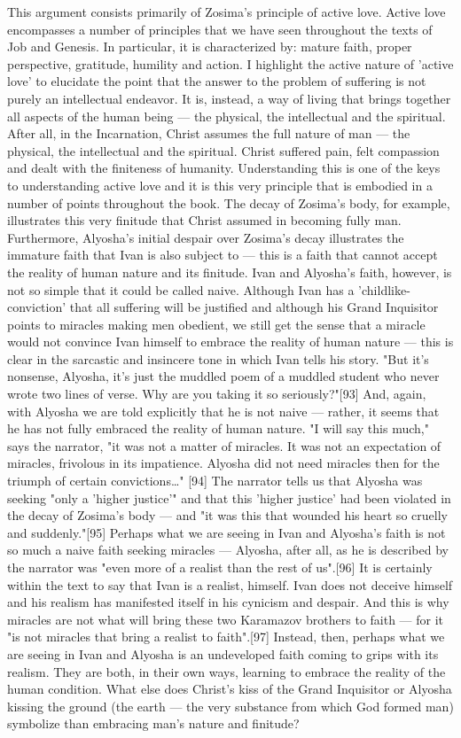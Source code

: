 This argument consists primarily of Zosima's principle of active love. Active love encompasses a number of principles that we have seen throughout the texts of Job and Genesis. In particular, it is characterized by: mature faith, proper perspective, gratitude, humility and action. I highlight the active nature of 'active love' to elucidate the point that the answer to the problem of suffering is not purely an intellectual endeavor. It is, instead, a way of living that brings together all aspects of the human being — the physical, the intellectual and the spiritual. After all, in the Incarnation, Christ assumes the full nature of man — the physical, the intellectual and the spiritual. Christ suffered pain, felt compassion and dealt with the finiteness of humanity. Understanding this is one of the keys to understanding active love and it is this very principle that is embodied in a number of points throughout the book. The decay of Zosima's body, for example, illustrates this very finitude that Christ assumed in becoming fully man. Furthermore, Alyosha's initial despair over Zosima's decay illustrates the immature faith that Ivan is also subject to — this is a faith that cannot accept the reality of human nature and its finitude.
Ivan and Alyosha's faith, however, is not so simple that it could be called naive. Although Ivan has a 'childlike-conviction' that all suffering will be justified and although his Grand Inquisitor points to miracles making men obedient, we still get the sense that a miracle would not convince Ivan himself to embrace the reality of human nature — this is clear in the sarcastic and insincere tone in which Ivan tells his story. "But it's nonsense, Alyosha, it's just the muddled poem of a muddled student who never wrote two lines of verse. Why are you taking it so seriously?"[93] And, again, with Alyosha we are told explicitly that he is not naive — rather, it seems that he has not fully embraced the reality of human nature. "I will say this much," says the narrator, "it was not a matter of miracles. It was not an expectation of miracles, frivolous in its impatience. Alyosha did not need miracles then for the triumph of certain convictions…" [94] The narrator tells us that Alyosha was seeking "only a 'higher justice'" and that this 'higher justice' had been violated in the decay of Zosima's body — and "it was this that wounded his heart so cruelly and suddenly."[95] Perhaps what we are seeing in Ivan and Alyosha's faith is not so much a naive faith seeking miracles — Alyosha, after all, as he is described by the narrator was "even more of a realist than the rest of us".[96] It is certainly within the text to say that Ivan is a realist, himself. Ivan does not deceive himself and his realism has manifested itself in his cynicism and despair. And this is why miracles are not what will bring these two Karamazov brothers to faith — for it "is not miracles that bring a realist to faith".[97] Instead, then, perhaps what we are seeing in Ivan and Alyosha is an undeveloped faith coming to grips with its realism. They are both, in their own ways, learning to embrace the reality of the human condition. What else does Christ's kiss of the Grand Inquisitor or Alyosha kissing the ground (the earth — the very substance from which God formed man) symbolize than embracing man's nature and finitude?
